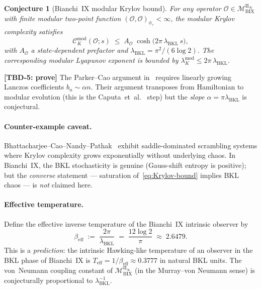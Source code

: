 \documentclass[12pt,a4paper]{article}
\newtheorem{conjecture}{Conjecture}
\begin{document}
\begin{conjecture}[Bianchi~IX modular Krylov bound]\label{conj:bound}
For any operator $\mathcal{O}\in\mathcal{M}_{\mathrm{BIX}}^{\mathrm{II}_\infty}$
with finite modular two-point function
$(\mathcal{O},\mathcal{O})_{\phi_\gamma}<\infty$, the modular Krylov
complexity satisfies
\begin{equation}
  \mathcal{C}_K^{\mathrm{mod}}(\mathcal{O};s)
  \;\le\;
  A_{\mathcal{O}}\;\cosh\!\bigl(2\pi\,\lambda_{\mathrm{BKL}}\,s\bigr),
  \label{eq:Krylov-bound}
\end{equation}
with $A_{\mathcal{O}}$ a state-dependent prefactor and
$\lambda_{\mathrm{BKL}} = \pi^2/(6\log 2)$.
The corresponding modular Lyapunov exponent is bounded by
$\lambda_K^{\mathrm{mod}} \le 2\pi\,\lambda_{\mathrm{BKL}}$.
\end{conjecture}

\noindent\textbf{[TBD-5: prove]} The Parker--Cao argument
in~\cite{Parker2019} requires linearly growing Lanczos coefficients
$b_n \sim \alpha n$. Their argument transposes from
Hamiltonian to modular evolution (this is the
Caputa~et~al.~\cite{Caputa2023} step) but the
\emph{slope} $\alpha = \pi\lambda_{\mathrm{BKL}}$ is conjectural.

\paragraph{Counter-example caveat.}
Bhattacharjee--Cao--Nandy--Pathak~\cite{BCNP2022} exhibit
saddle-dominated scrambling systems where Krylov complexity grows
exponentially without underlying chaos. In Bianchi~IX, the BKL
stochasticity is genuine (Gauss-shift entropy is positive); but the
\emph{converse} statement --- saturation of~\eqref{eq:Krylov-bound}
implies BKL chaos --- is \emph{not} claimed here.

\paragraph{Effective temperature.}
Define the effective inverse temperature of the Bianchi~IX intrinsic
observer by
\begin{equation}
  \beta_{\mathrm{eff}}
  \;:=\; \frac{2\pi}{\lambda_{\mathrm{BKL}}}
  \;=\; \frac{12\log 2}{\pi}
  \;\approx\; 2.6479.
  \label{eq:beta-eff}
\end{equation}
This is a \emph{prediction}: the intrinsic Hawking-like temperature
of an observer in the BKL phase of Bianchi~IX is
$T_{\mathrm{eff}} = 1/\beta_{\mathrm{eff}} \approx 0.3777$ in natural
BKL units.
The von~Neumann coupling constant of
$\mathcal{M}_{\mathrm{BIX}}^{\mathrm{II}_\infty}$
(in the Murray--von Neumann sense) is conjecturally
proportional to $\lambda_{\mathrm{BKL}}^{-1}$.
\end{document}
